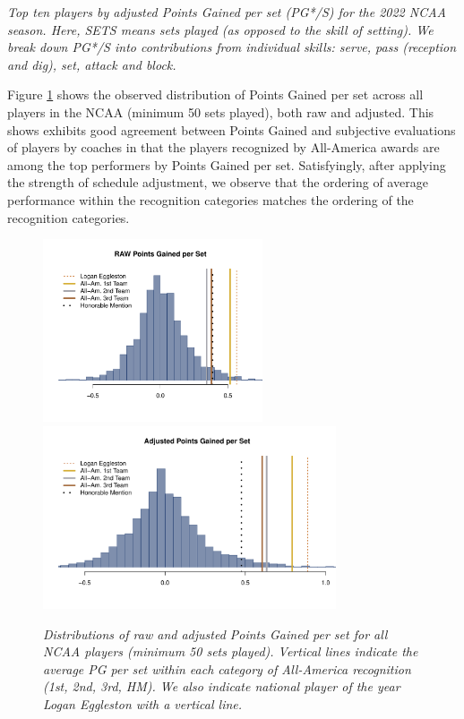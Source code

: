 \documentclass{article}
\begin{document}
\begin{table}
    \centering
    
    \caption{\it Top ten players by adjusted Points Gained per set (PG*/S) for the 2022 NCAA season. Here, SETS means sets played (as opposed to the skill of setting). We break down PG*/S into contributions from individual skills: serve, pass (reception and dig), set, attack and block.}
    \label{tab:top-ten-players}
\end{table}

Figure \ref{fig:avca-all-americans} shows the observed distribution of Points Gained per set across all players in the NCAA (minimum 50 sets played), both raw and adjusted. This shows exhibits good agreement between Points Gained and subjective evaluations of players by coaches in that the players recognized by All-America awards are among the top performers by Points Gained per set. Satisfyingly, after applying the strength of schedule adjustment, we observe that the ordering of average performance within the recognition categories matches the ordering of the recognition categories.

\begin{figure}
    \centering
    \includegraphics[height=5.4cm]{figures/avca_all_americans_raw.pdf}
    \includegraphics[height=5.4cm]{figures/avca_all_americans_adj.pdf}
    \caption{\it Distributions of raw and adjusted Points Gained per set for all NCAA players (minimum 50 sets played). Vertical lines indicate the average PG per set within each category of All-America recognition (1st, 2nd, 3rd, HM). We also indicate national player of the year Logan Eggleston with a vertical line.}
    \label{fig:avca-all-americans}
\end{figure}
\end{document}
